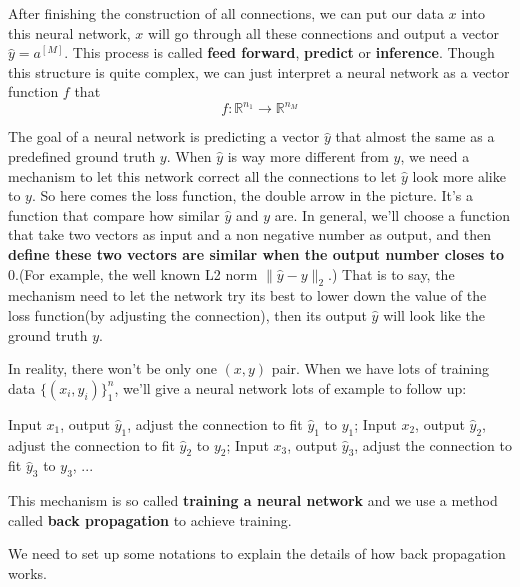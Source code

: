 \documentclass[../main.tex]{subfiles}
\begin{document}
            After finishing the construction of all connections, we can put our data $x$ into this neural network, $x$ will go through all these connections and output a vector $\hat{y}=a^{[M]}$.
            This process is called \textbf{feed forward}, \textbf{predict} or \textbf{inference}. Though this structure is quite complex, we can just interpret a neural network as a vector function $f$ that
            \[ 
                f:\mathbb{R}^{n_1} \rightarrow \mathbb{R}^{n_M}
            \]
            
            The goal of a neural network is predicting a vector $\hat{y}$ that almost the same as a predefined ground truth $y$.
            When $\hat{y}$ is way more different from $y$, we need a mechanism to let this network correct all the connections to let $\hat{y}$ look more alike to $y$.
            So here comes the loss function, the double arrow in the picture. It's a function that compare how similar $\hat{y}$ and $y$ are.
            In general, we'll choose a function that take two vectors as input and a non negative number as output, and then \textbf{define these two vectors are similar when the output number closes to} $0$.(For example, the well known L2 norm $\|\hat{y} - y\|_2$.)
            That is to say, the mechanism need to let the network try its best to lower down the value of the loss function(by adjusting the connection), then its output $\hat{y}$ will look like the ground truth $y$. 
            
            In reality, there won't be only one $(x, y)$ pair. When we have lots of training data $\{(x_i, y_i)\}_1^n$, we'll give a neural network lots of example to follow up: 
            \begin{displayquote}
                Input $x_1$, output $\hat{y}_1$, adjust the connection to fit $\hat{y}_1$ to $y_1$; Input $x_2$, output $\hat{y}_2$, adjust the connection to fit $\hat{y}_2$ to $y_2$; Input $x_3$, output $\hat{y}_3$, adjust the connection to fit $\hat{y}_3$ to $y_3$, ...
            \end{displayquote}
            
            This mechanism is so called \textbf{training a neural network} and we use a method called \textbf{back propagation} to achieve training.
            
            We need to set up some notations to explain the details of how back propagation works.
            
\end{document}
